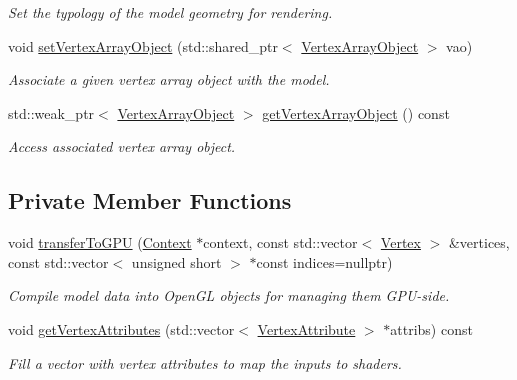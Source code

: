 \begin{DoxyCompactItemize}
\begin{DoxyCompactList}\small\item\em Set the typology of the model geometry for rendering. \end{DoxyCompactList}\item 
void \hyperlink{class_model_ade683835b46ca563594c0ff243ec5f1f}{set\+Vertex\+Array\+Object} (std\+::shared\+\_\+ptr$<$ \hyperlink{class_vertex_array_object}{Vertex\+Array\+Object} $>$ vao)
\begin{DoxyCompactList}\small\item\em Associate a given vertex array object with the model. \end{DoxyCompactList}\item 
std\+::weak\+\_\+ptr$<$ \hyperlink{class_vertex_array_object}{Vertex\+Array\+Object} $>$ \hyperlink{class_model_aabc7313d8e1160762a3d59584724fd2e}{get\+Vertex\+Array\+Object} () const 
\begin{DoxyCompactList}\small\item\em Access associated vertex array object. \end{DoxyCompactList}\end{DoxyCompactItemize}
\subsection*{Private Member Functions}
\begin{DoxyCompactItemize}
\item 
void \hyperlink{class_model_a5d5259d9548f9aae5562f3ecbb2803dc}{transfer\+To\+G\+PU} (\hyperlink{class_context}{Context} $\ast$context, const std\+::vector$<$ \hyperlink{struct_model_1_1_vertex}{Vertex} $>$ \&vertices, const std\+::vector$<$ unsigned short $>$ $\ast$const indices=nullptr)
\begin{DoxyCompactList}\small\item\em Compile model data into Open\+GL objects for managing them G\+P\+U-\/side. \end{DoxyCompactList}\item 
void \hyperlink{class_model_a26c6176bfee61caddc5e11180f9d3741}{get\+Vertex\+Attributes} (std\+::vector$<$ \hyperlink{class_vertex_attribute}{Vertex\+Attribute} $>$ $\ast$attribs) const 
\begin{DoxyCompactList}\small\item\em Fill a vector with vertex attributes to map the inputs to shaders. \end{DoxyCompactList}\end{DoxyCompactItemize}
